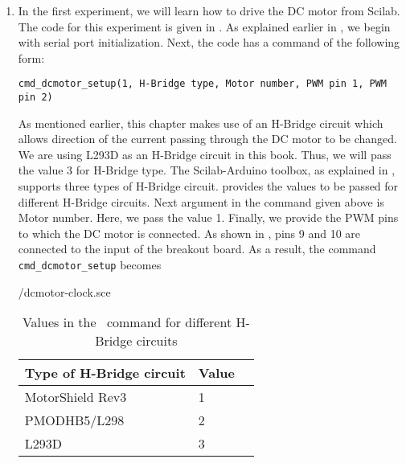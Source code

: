 \begin{enumerate}
  \item In the first experiment, we will learn how to drive the DC motor
        from Scilab. The code for this experiment is 
        given in  . As explained earlier in , 
        we begin with serial port initialization. 
        Next, the code has a command of the following form: 
        \begin{lstlisting}[style=nonumbers]
              cmd_dcmotor_setup(1, H-Bridge type, Motor number, PWM pin 1, PWM pin 2)
        \end{lstlisting}
        As mentioned earlier, this chapter makes use of an H-Bridge circuit which 
        allows direction of the current passing through the DC motor to be changed.
        We are using L293D as an H-Bridge circuit in this book. Thus, we will pass the value 3 for
        H-Bridge type. The Scilab-Arduino toolbox, as explained in , 
        supports three types of H-Bridge circuit. 
        provides the values to be passed for different H-Bridge circuits. 
        Next argument in the command given above is Motor number. Here, we pass the value 1. 
        Finally, we provide the PWM pins to which the DC motor is connected. As 
        shown in , pins 9 and 10 are connected to the
        input of the breakout board. As a result, the command {\tt cmd\_dcmotor\_setup} becomes
        
        {\LocDCMscicode/dcmotor-clock.sce}
        
        \begin{table}
          \centering
          \caption{Values in the \scilab\ command for different H-Bridge circuits}
          \label{table:convention}
          \begin{tabular}{llc}\hline
            Type of H-Bridge circuit & Value \\ \hline
            MotorShield Rev3         & 1                             \\ \hline 
            PMODHB5/L298             & 2                             \\ \hline 
            L293D                    & 3                             \\ \hline
          \end{tabular}
        \end{table}
        

\end{enumerate}
